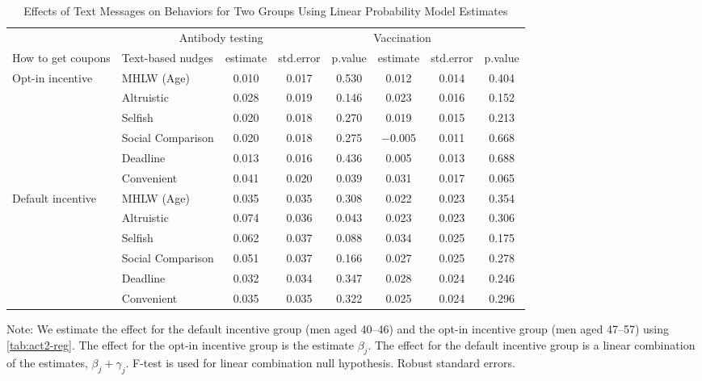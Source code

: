 \begin{table}

\caption{Effects of Text Messages on Behaviors for Two Groups Using Linear Probability Model Estimates \label{tab:act2-reg-ftest}}
\centering
\fontsize{9}{11}\selectfont
\begin{threeparttable}
\begin{tabular}[t]{>{\raggedright\arraybackslash}p{5em}lcccccc}
\toprule
\multicolumn{2}{c}{ } & \multicolumn{3}{c}{Antibody testing} & \multicolumn{3}{c}{Vaccination} \\
\cmidrule(l{3pt}r{3pt}){3-5} \cmidrule(l{3pt}r{3pt}){6-8}
How to get coupons & Text-based nudges & estimate & std.error & p.value & estimate  & std.error  & p.value \\
\midrule
Opt-in incentive & MHLW (Age) & \num{0.010} & \num{0.017} & \num{0.530} & \num{0.012} & \num{0.014} & \num{0.404}\\
 & Altruistic & \num{0.028} & \num{0.019} & \num{0.146} & \num{0.023} & \num{0.016} & \num{0.152}\\
 & Selfish & \num{0.020} & \num{0.018} & \num{0.270} & \num{0.019} & \num{0.015} & \num{0.213}\\
 & Social Comparison & \num{0.020} & \num{0.018} & \num{0.275} & \num{-0.005} & \num{0.011} & \num{0.668}\\
 & Deadline & \num{0.013} & \num{0.016} & \num{0.436} & \num{0.005} & \num{0.013} & \num{0.688}\\
 & Convenient & \num{0.041} & \num{0.020} & \num{0.039} & \num{0.031} & \num{0.017} & \num{0.065}\\
Default incentive & MHLW (Age) & \num{0.035} & \num{0.035} & \num{0.308} & \num{0.022} & \num{0.023} & \num{0.354}\\
 & Altruistic & \num{0.074} & \num{0.036} & \num{0.043} & \num{0.023} & \num{0.023} & \num{0.306}\\
 & Selfish & \num{0.062} & \num{0.037} & \num{0.088} & \num{0.034} & \num{0.025} & \num{0.175}\\
 & Social Comparison & \num{0.051} & \num{0.037} & \num{0.166} & \num{0.027} & \num{0.025} & \num{0.278}\\
 & Deadline & \num{0.032} & \num{0.034} & \num{0.347} & \num{0.028} & \num{0.024} & \num{0.246}\\
 & Convenient & \num{0.035} & \num{0.035} & \num{0.322} & \num{0.025} & \num{0.024} & \num{0.296}\\
\bottomrule
\end{tabular}
\begin{tablenotes}
\item Note: We estimate the effect for the default incentive group (men aged 40--46) and the opt-in incentive group (men aged 47--57) using \ref{tab:act2-reg}. The effect for the opt-in incentive group is the estimate $\beta_j$. The effect for the default incentive group is a linear combination of the estimates, $\beta_j + \gamma_j$. F-test is used for linear combination null hypothesis. Robust standard errors.
\end{tablenotes}
\end{threeparttable}
\end{table}
